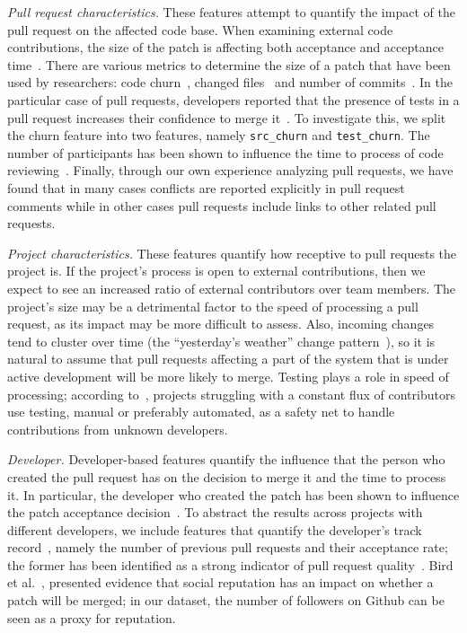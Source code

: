 \documentclass{sig-alternate}
\begin{document}
  \emph{Pull request characteristics.} These features attempt to quantify the
  impact of the pull request on the affected code base. When examining external
  code contributions, the size of the patch is affecting both acceptance and
  acceptance time~\cite{Weiss08}. There are various metrics to determine the
  size of a patch that have been used by researchers: code churn~\cite{Nagap05,
  Ratzi07}, changed files~\cite{Nagap05} and number of commits~\cite{Fluri07}.
  In the particular case of pull requests, developers reported that the presence
  of tests in a pull request increases their confidence to merge
  it~\cite{Pham13}. To investigate this, we split the churn feature into two
  features, namely \texttt{src\_churn} and \texttt{test\_churn}. The
  number of participants has been shown to influence the time to process of code
  reviewing~\cite{Rigby13}. Finally, through our own experience analyzing pull
  requests, we have found that in many cases conflicts are reported explicitly
  in pull request comments while in other cases pull requests include links to
  other related pull requests.

  \emph{Project characteristics.} These features quantify how receptive to pull
  requests the project is. If the project's process is open to external
  contributions, then we expect to see an increased ratio of external
  contributors over team members. The project's size may be a detrimental factor
  to the speed of processing a pull request, as its impact may be more difficult
  to assess. Also, incoming changes tend to cluster over time (the ``yesterday's
  weather'' change pattern~\cite{Girba04}), so it is natural to assume that pull
  requests affecting a part of the system that is under active development will
  be more likely to merge. Testing plays a role in speed of processing;
  according to~\cite{Pham13}, projects struggling with a constant flux of
  contributors use testing, manual or preferably automated, as a safety net to
  handle contributions from unknown developers.

  \emph{Developer.}  Developer-based features quantify the influence that the
  person who created the pull request has on the decision to merge it and the
  time to process it. In particular, the developer who created the patch has
  been shown to influence the patch acceptance decision~\cite{Jeong09}. To
  abstract the results across projects with different developers, we include
  features that quantify the developer's track record~\cite{Dabbi12}, namely the
  number of previous pull requests and their acceptance rate; the former has
  been identified as a strong indicator of pull request quality~\cite{Pham13}.
  Bird et al.~\cite{Bird07}, presented evidence that social reputation has an
  impact on whether a patch will be merged; in our dataset, the number of
  followers on Github can be seen as a proxy for reputation.
\end{document}

